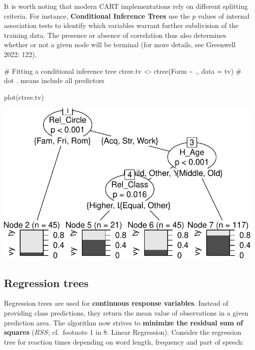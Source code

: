 \documentclass[
  11pt,
  letterpaper,
  DIV=11,
  numbers=noendperiod]{scrreprt}
\newenvironment{Shaded}{\begin{snugshade}}{\end{snugshade}}
\newcommand{\AttributeTok}[1]{\textcolor[rgb]{0.40,0.45,0.13}{#1}}
\newcommand{\CommentTok}[1]{\textcolor[rgb]{0.37,0.37,0.37}{#1}}
\newcommand{\FunctionTok}[1]{\textcolor[rgb]{0.28,0.35,0.67}{#1}}
\newcommand{\NormalTok}[1]{\textcolor[rgb]{0.00,0.23,0.31}{#1}}
\newcommand{\OtherTok}[1]{\textcolor[rgb]{0.00,0.23,0.31}{#1}}
\newcommand{\SpecialCharTok}[1]{\textcolor[rgb]{0.37,0.37,0.37}{#1}}
\begin{document}
It is worth noting that modern CART implementations rely on different
splitting criteria. For instance, \textbf{Conditional Inference Trees}
use the \(p\) values of internal association tests to identify which
variables warrant further subdivision of the training data. The presence
or absence of correlation thus also determines whether or not a given
node will be terminal (for more details, see Greenwell 2022: 122).

\begin{Shaded}
\begin{Highlighting}[]
\CommentTok{\# Fitting a conditional inference tree}
\NormalTok{ctree.tv }\OtherTok{\textless{}{-}} \FunctionTok{ctree}\NormalTok{(Form }\SpecialCharTok{\textasciitilde{}}\NormalTok{ ., }\AttributeTok{data =}\NormalTok{ tv) }\CommentTok{\# dot . means \textquotesingle{}include all predictors\textquotesingle{}}

\FunctionTok{plot}\NormalTok{(ctree.tv)}
\end{Highlighting}
\end{Shaded}

\includegraphics{Decision_trees_and_random_forests_files/figure-pdf/unnamed-chunk-5-1.pdf}

\subsection{Regression trees}\label{regression-trees}

Regression trees are used for \textbf{continuous response variables}.
Instead of providing class predictions, they return the mean value of
observations in a given prediction area. The algorithm now strives to
\textbf{minimize the residual sum of squares} (\(RSS\); cf.~footnote 1
in 8. Linear Regression). Consider the regression tree for reaction
times depending on word length, frequency and part of speech:
\end{document}
